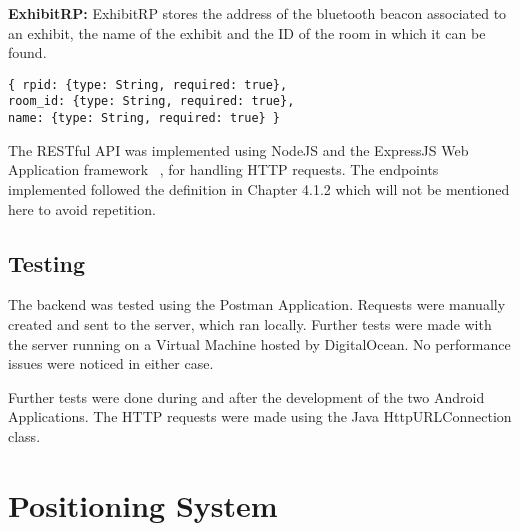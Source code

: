 \noindent
\textbf{ExhibitRP:}
ExhibitRP stores the address of the bluetooth beacon associated to an exhibit, the name of the exhibit and the ID of the room in which it can be found.
\begin{lstlisting}
{ rpid: {type: String, required: true},
room_id: {type: String, required: true},
name: {type: String, required: true} }
\end{lstlisting}

The RESTful API was implemented using NodeJS and the ExpressJS Web Application framework ~\cite{ExpressJS}, for handling HTTP requests. The endpoints implemented followed the definition in Chapter 4.1.2 which will not be mentioned here to avoid repetition.

\subsection{Testing}
The backend was tested using the Postman Application. Requests were manually created and sent to the server, which ran locally. Further tests were made with the server running on a Virtual Machine hosted by DigitalOcean. No performance issues were noticed in either case.

Further tests were done during and after the development of the two Android Applications. The HTTP requests were made using the Java HttpURLConnection class.

\section{Positioning System}

